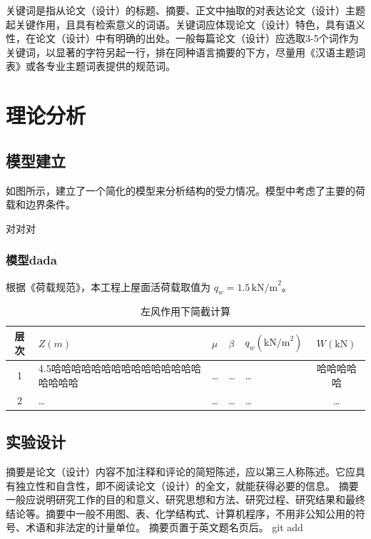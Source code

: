 \documentclass{document}
\begin{document}
关键词是指从论文（设计）的标题、摘要、正文中抽取的对表达论文（设计）主题起关键作用，且具有检索意义的词语。关键词应体现论文（设计）特色，具有语义性，在论文（设计）中有明确的出处。一般每篇论文（设计）应选取3-5个词作为关键词，以显著的字符另起一行，排在同种语言摘要的下方，尽量用《汉语主题词表》或各专业主题词表提供的规范词。\cite{10.1145/3583780.3615277}  

\section{理论分析}

\subsection{模型建立}

如图所示，建立了一个简化的模型来分析结构的受力情况。模型中考虑了主要的荷载和边界条件。



对对对

\subsubsection{模型dada}
根据《荷载规范》，本工程上屋面活荷载取值为 $q_w = 1.5 \, \text{kN/m}^2$。

\begin{table}[htbp]
    \centering
    \caption{左风作用下简截计算}
    \begin{tabularx}{0.8\textwidth}{cXXXXc} %
      \toprule
      层次 & $Z(m)$ & $\mu$ & $\beta$ & $q_w (\text{kN/m}^2)$ & $W (\text{kN})$ \\
      \midrule
      1 & 4.5哈哈哈哈哈哈哈哈哈哈哈哈哈哈哈哈哈哈哈 & … & … & … & 哈哈哈哈哈 \\
      2 & … & … & … & … & … \\
      \bottomrule
    \end{tabularx} 
\end{table}
\subsection{实验设计}
摘要是论文（设计）内容不加注释和评论的简短陈述，应以第三人称陈述。它应具有独立性和自含性，即不阅读论文（设计）的全文，就能获得必要的信息。
摘要一般应说明研究工作的目的和意义、研究思想和方法、研究过程、研究结果和最终结论等。摘要中一般不用图、表、化学结构式、计算机程序，不用非公知公用的符号、术语和非法定的计量单位。
摘要页置于英文题名页后。   git add
\end{document}

